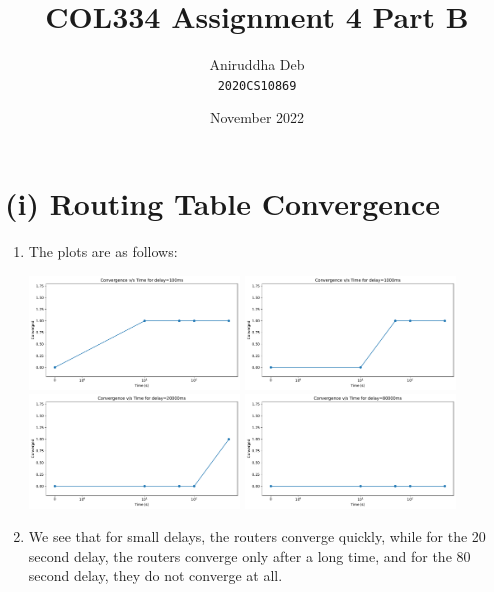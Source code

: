 \documentclass[12pt]{article}
\title{\textbf{COL334 Assignment 4 Part B}}
\author{Aniruddha Deb \\ \texttt{2020CS10869}}
\date{November 2022}
\begin{document}
\maketitle

\section*{(i) Routing Table Convergence}

\begin{enumerate}[label=(\alph*)]
    \item The plots are as follows:
    \begin{center}
        \includegraphics[width=0.44\textwidth]{../Q2/q2a_convergence_100ms.pdf}
        \includegraphics[width=0.44\textwidth]{../Q2/q2a_convergence_1000ms.pdf}
        \includegraphics[width=0.44\textwidth]{../Q2/q2a_convergence_20000ms.pdf}
        \includegraphics[width=0.44\textwidth]{../Q2/q2a_convergence_80000ms.pdf}
    \end{center}

    \item We see that for small delays, the routers converge quickly, while for the 
    20 second delay, the routers converge only after a long time, and for the 
    80 second delay, they do not converge at all.

\end{enumerate}
\end{document}

